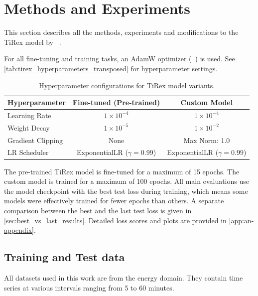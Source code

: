 \documentclass[a4paper,oneside,10pt,ngerman,english]{scrartcl}
\begin{document}
\section{Methods and Experiments}
\label{sec:methods}

This section describes all the methods, experiments and modifications to the TiRex model by \citeauthor{auer2025tirexzeroshotforecastinglong}~\cite{auer2025tirexzeroshotforecastinglong}.

For all fine-tuning and training tasks, an AdamW optimizer (\citeauthor{loshchilov2019decoupledweightdecayregularization}~\cite{loshchilov2019decoupledweightdecayregularization}) is used. See \autoref{tab:tirex_hyperparameters_transposed} for hyperparameter settings.

\begin{table}[htbp]
	\centering
	\caption{Hyperparameter configurations for TiRex model variants.}
	\label{tab:tirex_hyperparameters_transposed}
	\begin{tabular}{lcc}
		\toprule
		\textbf{Hyperparameter} & \textbf{Fine-tuned (Pre-trained)} & \textbf{Custom Model} \\
		\midrule
		Learning Rate     & $1 \times 10^{-4}$ & $1 \times 10^{-4}$ \\
		Weight Decay      & $1 \times 10^{-5}$ & $1 \times 10^{-2}$ \\
		Gradient Clipping & None               & Max Norm: 1.0 \\
		LR Scheduler      & ExponentialLR ($\gamma = 0.99$) & ExponentialLR ($\gamma = 0.99$) \\
		\bottomrule
	\end{tabular}
\end{table}

The pre-trained TiRex model is fine-tuned for a maximum of 15 epochs. The custom model is trained for a maximum of 100 epochs. All main evaluations use the model checkpoint with the best test loss during training, which means some models were effectively trained for fewer epochs than others. A separate comparison between the best and the last test loss is given in \autoref{sec:best_vs_last_results}. Detailed loss scores and plots are provided in \autoref{app:an-appendix}.

\subsection{Training and Test data}
\label{sec:data}
All datasets used in this work are from the energy domain. They contain time series at various intervals ranging from 5 to 60 minutes. 
\end{document}
